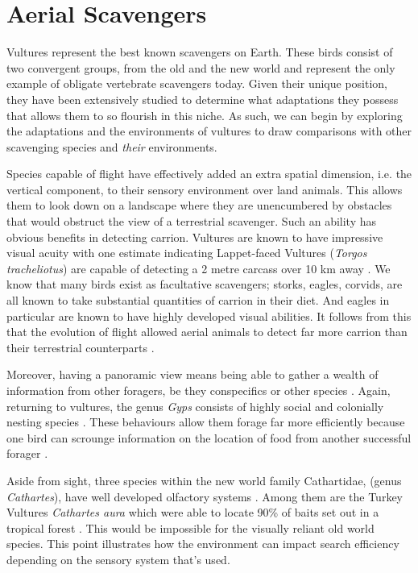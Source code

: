 \documentclass[a4paper,12pt]{article}
\begin{document}
\section*{Aerial Scavengers}

Vultures represent the best known scavengers on Earth. These birds consist of two convergent groups, from the old and the new world and represent the only example of obligate vertebrate scavengers today. Given their unique position,%
 they have been extensively studied to determine what adaptations they possess that allows them to so flourish in this niche. As such, we can begin by exploring the adaptations and the environments of vultures to draw comparisons with other scavenging species and \textit{their} environments. 

Species capable of flight have effectively added an extra spatial dimension, i.e. the vertical component, to their sensory environment over land animals. This allows them to look down on a landscape where they are unencumbered by obstacles that would obstruct the view of a terrestrial scavenger. Such an ability has obvious benefits in detecting carrion. Vultures are known to have impressive visual acuity with one estimate indicating Lappet-faced Vultures (\textit{Torgos tracheliotus}) are capable of detecting a 2 metre carcass over 10 km away \citep{spiegel2013factors}. We know that many birds exist as facultative scavengers; storks, eagles, corvids, are all known to take substantial quantities of carrion in their diet. And eagles in particular are known to have highly developed visual abilities. It follows from this that the evolution of flight allowed aerial animals to detect far more carrion than their terrestrial counterparts \citep{AR:AR22815}.

Moreover, having a panoramic view means being able to gather a wealth of information from other foragers, be they conspecifics or other species \citep{jackson2008effect}. Again, returning to vultures, the genus \textit{Gyps} consists of highly social and colonially nesting species \citep{fernandez2015density}. These behaviours allow them forage far more efficiently because one bird can scrounge information on the location of food from another successful forager \citep{KaneVul}. 

Aside from sight, three species within the new world family Cathartidae, (genus \textit{Cathartes}), have well developed olfactory systems \citep{AR:AR22815}. Among them are the Turkey Vultures \textit{Cathartes aura} which were able to locate 90\% of baits set out in a tropical forest \citep{houston1986olfaction}. This would be impossible for the visually reliant old world species. This point illustrates how the environment can impact search efficiency depending on the sensory system that's used. 
\end{document}

